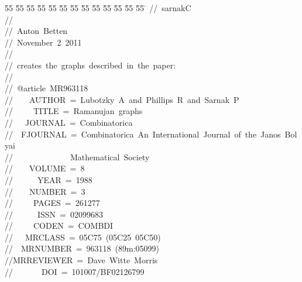 %
%
\begin{tabbing}
55 \= 55 \= 55 \= 55 \= 55 \= 55 \= 55 \= 55 \= 55 \= 55 \= 55 \= 55 \= 55 \= \kill
//\ sarnakC\\[0pt]
//\\[0pt]
//\ Anton\ Betten\\[0pt]
//\ November\ 2\ 2011\\[0pt]
//\\[0pt]
//\ creates\ the\ graphs\ described\ in\ the\ paper:\\[0pt]
//\\[0pt]
//\ @article\ MR963118\\[0pt]
//\ \ \ \ AUTHOR\ =\ Lubotzky\ A\ and\ Phillips\ R\ and\ Sarnak\ P\\[0pt]
//\ \ \ \ \ TITLE\ =\ Ramanujan\ graphs\\[0pt]
//\ \ \ JOURNAL\ =\ Combinatorica\\[0pt]
//\ \ FJOURNAL\ =\ Combinatorica\ An\ International\ Journal\ of\ the\ Janos\ Bolyai\\[0pt]
//\ \ \ \ \ \ \ \ \ \ \ \ \ \ Mathematical\ Society\\[0pt]
//\ \ \ \ VOLUME\ =\ 8\\[0pt]
//\ \ \ \ \ \ YEAR\ =\ 1988\\[0pt]
//\ \ \ \ NUMBER\ =\ 3\\[0pt]
//\ \ \ \ \ PAGES\ =\ 261277\\[0pt]
//\ \ \ \ \ \ ISSN\ =\ 02099683\\[0pt]
//\ \ \ \ \ CODEN\ =\ COMBDI\\[0pt]
//\ \ \ MRCLASS\ =\ 05C75\ (05C25\ 05C50)\\[0pt]
//\ \ MRNUMBER\ =\ 963118\ (89m:05099)\\[0pt]
//MRREVIEWER\ =\ Dave\ Witte\ Morris\\[0pt]
//\ \ \ \ \ \ \ DOI\ =\ 101007/BF02126799\\[0pt]

\end{tabbing}

